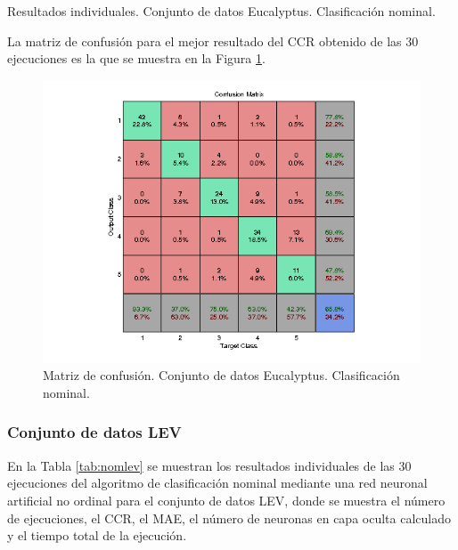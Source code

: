 			\begin{table}[!htbp]
				\centering
				\caption{Resultados individuales. Conjunto de datos Eucalyptus. Clasificación nominal.}
				\label{tab:nomeuc}
			\end{table}
			
			La matriz de confusión para el mejor resultado del CCR obtenido de las 30 ejecuciones es la que se muestra en la Figura \ref{fig:nomeuc}.
			
			\begin{figure}[htbp]
				\centering
				\includegraphics[scale=0.8]{../src/results/nominal/eucalyptus_mc1.png}
				\caption{Matriz de confusión. Conjunto de datos Eucalyptus. Clasificación nominal.}
				\label{fig:nomeuc}
			\end{figure}

			\subsubsection{Conjunto de datos LEV}
			
			En la Tabla \ref{tab:nomlev} se muestran los resultados individuales de las 30 ejecuciones del algoritmo de clasificación nominal mediante una red neuronal artificial no ordinal para el conjunto de datos LEV, donde se muestra el número de ejecuciones, el CCR, el MAE, el número de neuronas en capa oculta calculado y el tiempo total de la ejecución.\\
			
